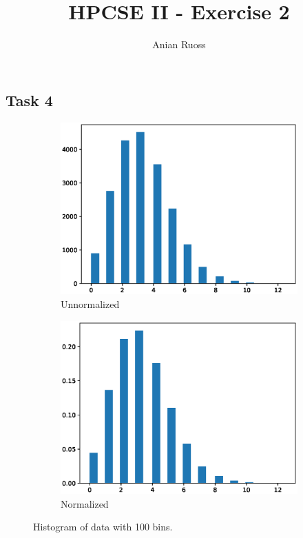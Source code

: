 \documentclass[11pt]{article}
\begin{document}
    \title{HPCSE II - Exercise 2}
    \author{Anian Ruoss}
    \maketitle

    \subsection*{Task 4}

    \begin{figure}[H]
        \begin{subfigure}{.5\textwidth}
            \begin{center}
                \includegraphics[width=\textwidth]{plots/hist.eps}
                \caption{Unnormalized}
            \end{center}
        \end{subfigure}
        \begin{subfigure}{.5\textwidth}
            \begin{center}
                \includegraphics[width=\textwidth]{plots/hist_normalized.eps}
                \caption{Normalized}
            \end{center}
        \end{subfigure}
        \caption{Histogram of data with 100 bins.}
    \end{figure}
\end{document}
